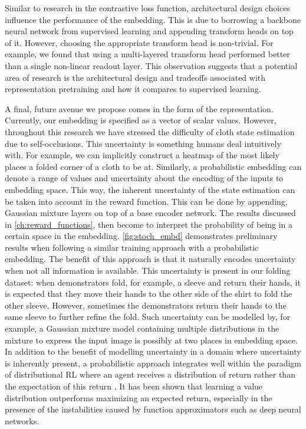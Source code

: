 \documentclass[\home/main.tex]{subfiles}
\begin{document}
Similar to research in the contrastive loss function, architectural design choices influence the performance of the embedding. This is due to borrowing a backbone neural network from supervised learning and appending transform heads on top of it. However, choosing the appropriate transform head is non-trivial. For example, we found that using a multi-layered transform head performed better than a single non-linear readout layer. This observation suggests that a potential area of research is the architectural design and tradeoffs associated with representation pretraining and how it compares to supervised learning.

A final, future avenue we propose comes in the form of the representation. Currently, our embedding is specified as a vector of scalar values. However, throughout this research we have stressed the difficulty of cloth state estimation due to self-occlusions. This uncertainty is something humans deal intuitively with. For example, we can implicitly construct a heatmap of the most likely places a folded corner of a cloth to be at. Similarly, a probabilistic embedding can denote a range of values and uncertainty about the encoding of the inputs to embedding space. This way, the inherent uncertainty of the state estimation can be taken into account in the reward function. This can be done by appending, Gaussian mixture layers on top of a base encoder network. The results discussed in \cref{ch:reward_functions}, then become to interpret the probability of being in a certain space in the embedding. \cref{fig:stoch_embd} demonstrates preliminary results when following a similar training approach with a probabilistic embedding. The benefit of this approach is that it naturally encodes uncertainty when not all information is available. This uncertainty is present in our folding dataset: when demonstrators fold, for example, a sleeve and return their hands, it is expected that they move their hands to the other side of the shirt to fold the other sleeve. However, sometimes the demonstrators return their hands to the same sleeve to further refine the fold. Such uncertainty can be modelled by, for example, a Gaussian mixture model containing multiple distributions in the mixture to express the input image is possibly at two places in embedding space. In addition to the benefit of modelling uncertainty in a domain where uncertainty is inherently present, a probabilistic approach integrates well within the paradigm of distributional RL where an agent receives a distribution of return rather than the expectation of this return \autocite{bellemare2017distributional}. It has been shown that learning a value distribution outperforms maximizing an expected return, especially in the presence of the instabilities caused by function approximators such as deep neural networks.
\end{document}
